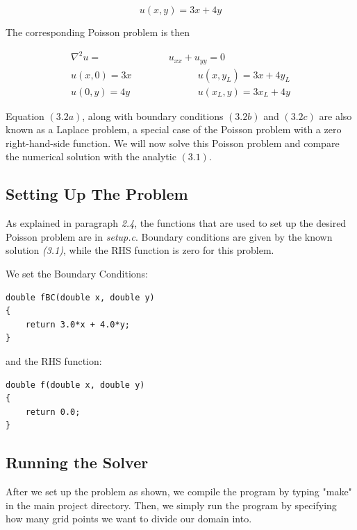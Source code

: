 \documentclass[11pt]{report}
\begin{document}
\begin{equation}
u(x,y) = 3x + 4y
\end{equation}

The corresponding Poisson problem is then

\begin{subequations}
\begin{align}
\nabla ^2 u = &u_{xx} + u_{yy} = 0 \\
u(x,0) = 3x \quad \quad \quad & \quad \quad \quad u(x,y_L) = 3x + 4y_L \\
u(0,y) = 4y \quad \quad \quad & \quad \quad \quad u(x_L,y) = 3x_L + 4y
\end{align}
\end{subequations}

Equation $(3.2a)$, along with boundary conditions $(3.2b)$ and $(3.2c)$ are also known as a Laplace problem, a special case of the Poisson problem with a zero right-hand-side function. We will now solve this Poisson problem and compare the numerical solution with the analytic $(3.1)$.

\subsection{Setting Up The Problem}
As explained in paragraph \emph{2.4}, the functions that are used to set up the desired Poisson problem are in \emph{setup.c}. Boundary conditions are given by the known solution \emph{(3.1)}, while the RHS function is zero for this problem. 
\newline

We set the Boundary Conditions:

\begin{lstlisting}
double fBC(double x, double y) 
{
    return 3.0*x + 4.0*y;
}
\end{lstlisting}

and the RHS function:

\begin{lstlisting}
double f(double x, double y) 
{
    return 0.0;
}
\end{lstlisting}

\subsection{Running the Solver}
After we set up the problem as shown, we compile the program by typing "make" in the main project directory. 
Then, we simply run the program by specifying how many grid points we want to divide our domain into. 
\newline 
\end{document}
